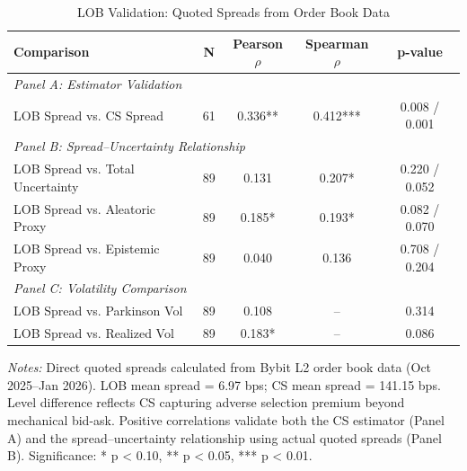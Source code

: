 
\begin{table}[htbp]
\centering
\caption{LOB Validation: Quoted Spreads from Order Book Data}
\label{tab:lob_validation}
\small
\begin{tabular}{@{}lcccc@{}}
\toprule
\textbf{Comparison} & \textbf{N} & \textbf{Pearson $\rho$} & \textbf{Spearman $\rho$} & \textbf{p-value} \\
\midrule
\multicolumn{5}{l}{\textit{Panel A: Estimator Validation}} \\
LOB Spread vs. CS Spread & 61 & 0.336** & 0.412*** & 0.008 / 0.001 \\
\midrule
\multicolumn{5}{l}{\textit{Panel B: Spread--Uncertainty Relationship}} \\
LOB Spread vs. Total Uncertainty & 89 & 0.131 & 0.207* & 0.220 / 0.052 \\
LOB Spread vs. Aleatoric Proxy & 89 & 0.185* & 0.193* & 0.082 / 0.070 \\
LOB Spread vs. Epistemic Proxy & 89 & 0.040 & 0.136 & 0.708 / 0.204 \\
\midrule
\multicolumn{5}{l}{\textit{Panel C: Volatility Comparison}} \\
LOB Spread vs. Parkinson Vol & 89 & 0.108 & -- & 0.314 \\
LOB Spread vs. Realized Vol & 89 & 0.183* & -- & 0.086 \\
\bottomrule
\end{tabular}
\vspace{0.5em}
\begin{minipage}{0.95\textwidth}
\footnotesize
\textit{Notes:} Direct quoted spreads calculated from Bybit L2 order book data (Oct 2025--Jan 2026).
LOB mean spread = 6.97 bps; CS mean spread = 141.15 bps. Level difference reflects CS capturing
adverse selection premium beyond mechanical bid-ask. Positive correlations validate both the
CS estimator (Panel A) and the spread--uncertainty relationship using actual quoted spreads
(Panel B). Significance: * p < 0.10, ** p < 0.05, *** p < 0.01.
\end{minipage}
\end{table}
